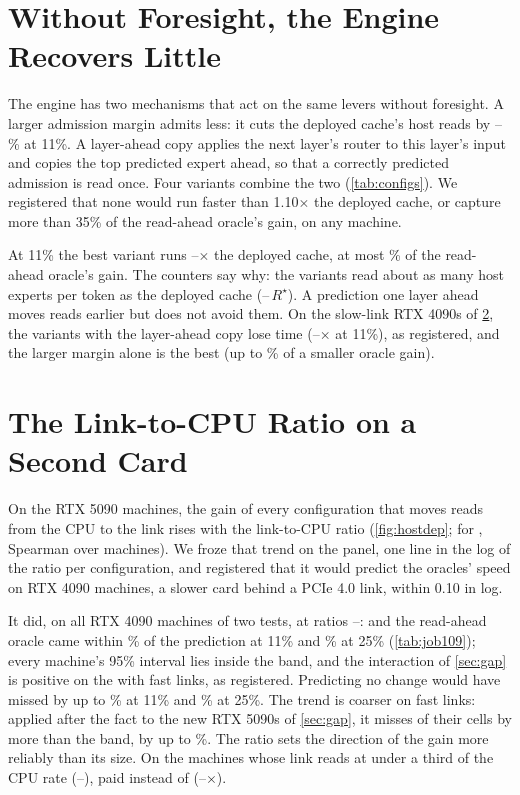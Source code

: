 \section{Without Foresight, the Engine Recovers Little}\label{sec:online}
The engine has two mechanisms that act on the same levers without foresight. A larger admission margin admits less:
it cuts the deployed cache's host reads by \jiDkReadsGLowMin--\jiDkReadsGLowMax\% at 11\%. A layer-ahead copy applies the
next layer's router to this layer's input and copies the top predicted expert ahead, so that a correctly predicted
admission is read once. Four variants combine the two (\cref{tab:configs}). We registered that none would run faster than
1.10$\times$ the deployed cache, or capture more than 35\% of the read-ahead oracle's gain, on any machine.

At 11\% the best variant runs \olBestLowMin--\olBestLowMax$\times$ the deployed cache, at most \olCapLowMax\% of the
read-ahead oracle's gain. The counters say why: the variants read about as many host experts per token as the deployed
cache (\olReadsFourLowMin--\olReadsFourLowMax$\,R^\star$). A prediction one layer ahead moves reads earlier but does not
avoid them. On the slow-link RTX 4090s of \cref{sec:secondcard}, the variants with the layer-ahead copy lose time
(\cxLayerLowMin--\cxLayerLowMax$\times$ at 11\%), as registered, and the larger margin alone is the best (up to
\cxCapLowMax\% of a smaller oracle gain).



\section{The Link-to-CPU Ratio on a Second Card}\label{sec:secondcard}
On the RTX 5090 machines, the gain of every configuration that moves reads from the CPU to the link rises with the
link-to-CPU ratio (\cref{fig:hostdep}; for \MinOne, Spearman \rcFetchRatio{} over \rcFetchRatioN{} machines). We froze
that trend on the panel, one line in the log of the ratio per configuration, and registered that it would predict the
oracles' speed on RTX 4090 machines, a slower card behind a PCIe 4.0 link, within 0.10 in log.

It did, on all \cxAllNWord{} RTX 4090 machines of two tests, at ratios \cxAllRatioMin--\cxAllRatioMax: \MinOne{} and the
read-ahead oracle came within \cxAllDevLowMax\% of the prediction at 11\% and \cxAllDevMidMax\% at 25\%
(\cref{tab:job109}); every machine's 95\% interval lies inside the band, and the interaction of \cref{sec:gap} is
positive on the \tcFourFastN{} with fast links, as registered. Predicting no change would have missed by up to \cxNoChangeDevLowMax\% at 11\% and
\cxNoChangeDevMidMax\% at 25\%. The trend is coarser on
fast links: applied after the fact to the new RTX 5090s of \cref{sec:gap}, it misses \olTrendMissWord{} of their
\olTrendCells{} cells by more than the band, by up to \olTrendDevMax\%. The ratio sets the direction of the gain more
reliably than its size. On the \jkSlowBpMachines{} machines whose link reads at under a third of the CPU rate
(\jkSlowBpRatioMin--\jkSlowBpRatioMax), \FewTwo{} paid instead of \MinOne{}
(\jkSlowBypassPlanMin--\jkSlowBypassPlanMax$\times$).

